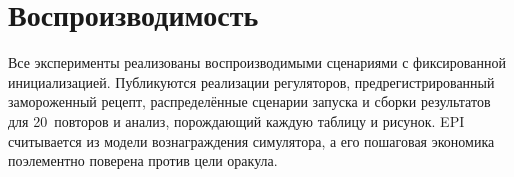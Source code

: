 \documentclass[preprint,3p]{elsarticle}
\begin{document}
\section*{Воспроизводимость}
Все эксперименты реализованы воспроизводимыми сценариями с фиксированной инициализацией.
Публикуются реализации регуляторов, предрегистрированный замороженный рецепт, распределённые
сценарии запуска и сборки результатов для 20~повторов и анализ, порождающий каждую таблицу и
рисунок. EPI считывается из модели
вознаграждения симулятора, а его пошаговая экономика поэлементно поверена против цели оракула.



\end{document}
